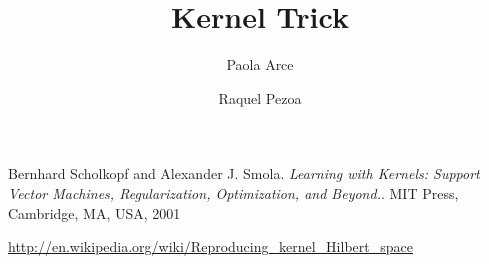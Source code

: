 \documentclass[12pt,reqno]{amsart}
\title{Kernel Trick}
\author{Paola Arce \and Raquel Pezoa}
\begin{document}
\maketitle










\begin{thebibliography}{9}

Bernhard Scholkopf and Alexander J. Smola. 
\emph{Learning with Kernels: Support Vector Machines, 
Regularization, Optimization, and Beyond.}.
MIT Press, Cambridge, MA, USA, 2001

\url{http://en.wikipedia.org/wiki/Reproducing_kernel_Hilbert_space}

\end{thebibliography}
\end{document}

